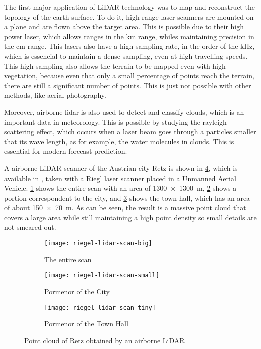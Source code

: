 The first major application of LiDAR technology was to map and reconstruct the topology of the earth surface. To do it, high range laser scanners are mounted on a plane and are flown above the target area. This is possible due to their high power laser, which allows ranges in the \si{\kilo\meter} range, whiles maintaining precision in the \si{\centi\meter} range. This lasers also have a high sampling rate, in the order of the \si{\kilo\hertz}, which is essencial to maintain a dense sampling, even at high travelling speeds. This high sampling also allows the terrain to be mapped even with high vegetation, because even that only a small percentage of points reach the terrain, there are still a significant number of points. This is just not possible with other methods, like aerial photography. 

Moreover, airborne lidar is also used to detect and classify clouds, which is an important data in meteorology. This is possible by studying the rayleigh scattering effect, which occurs when a laser beam goes through a particles smaller that its wave length, as for example, the water molecules in clouds.  This is essential for modern forecast prediction.

A airborne LiDAR scanner of the Austrian city Retz is shown in \cref{fig:riegl-lidar-scan}, which is available in \cite{potree-retz}, taken with a Riegl laser scanner placed in a Unmanned Aerial Vehicle. \cref{fig:riegl-lidar-scan-big} shows the entire scan with an area of \SI{1300 x 1300}{\meter}, \cref{fig:riegl-lidar-scan-small} shows a portion correspondent to the city, and \cref{fig:riegl-lidar-scan-tiny} shows the town hall, which has an area of about \SI{150 x 70}{\meter}. As can be seen, the result is a massive point cloud that covers a large area while still maintaining a high point density so small details are not smeared out. 

\begin{figure}[p]
    \centering
    \begin{subfigure}{\textwidth}
        \centering
        \texttt{[image: riegel-lidar-scan-big]}
        \caption{The entire scan}
        \label{fig:riegl-lidar-scan-big}
    \end{subfigure}

    \centering
    \begin{subfigure}{\textwidth}
        \centering
        \texttt{[image: riegel-lidar-scan-small]}
        \caption{Pormenor of the City}
        \label{fig:riegl-lidar-scan-small}
    \end{subfigure}

    \centering
    \begin{subfigure}{\textwidth}
        \centering
        \texttt{[image: riegel-lidar-scan-tiny]}
        \caption{Pormenor of the Town Hall}
        \label{fig:riegl-lidar-scan-tiny}
    \end{subfigure}

    \caption{Point cloud of Retz obtained by an airborne LiDAR}
    \label{fig:riegl-lidar-scan}
\end{figure}

